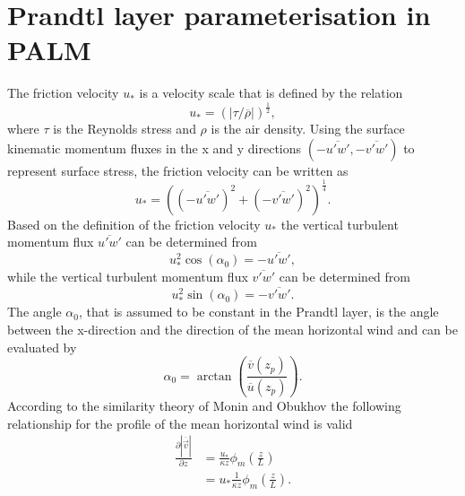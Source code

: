 \documentclass[11pt,a4paper,titlepage]{scrreprt}
\begin{document}
\pagebreak

\chapter{Prandtl layer parameterisation in PALM}

The friction velocity $u_{\ast}$ is a velocity scale that is defined by the relation 
\begin{equation}
u_{\ast}=\left ( \left | \tau / \overline{\rho} \right | \right )^{\frac{1}{2}}, 
\end{equation}
where $\tau$ is the Reynolds stress and $\rho$ is the air density.
Using the surface kinematic momentum fluxes in the x and y directions 
$\left ( -\overline{u'w'}, -\overline{v'w'} \right )$ to represent 
surface stress, the friction velocity can be written as   
\begin{equation}
u_{\ast}=\left ( (-\overline{u'w'})^2 + (-\overline{v'w'})^2 \right )^{\frac{1}{4}}.
\end{equation}
Based on the definition of the friction velocity $u_{\ast}$ the vertical turbulent 
momentum flux $\overline{u'w'}$ can be determined from 
\begin{equation}
{u^2_{\ast}} \cos \left ( \alpha_0 \right ) = - \overline{u'w'},
\end{equation}
while the vertical turbulent momentum flux $\overline{v'w'}$ can be determined 
from  
\begin{equation}
{u^2_{\ast}} \sin \left ( \alpha_0 \right ) = - \overline{v'w'}.
\end{equation}
The angle $\alpha_0$, that is assumed to be constant in the Prandtl layer, is the 
angle between the x-direction and the direction of the mean horizontal wind and can 
be evaluated by   
\begin{equation} \label{win}
\alpha_0 = \arctan \left ( \frac{\overline{v}(z_p)}{\overline{u}(z_p)} \right ).
\end{equation}
According to the similarity theory of Monin and Obukhov the following relationship for 
the profile of the mean horizontal wind is valid
\begin{equation} \label{hmpr}
\begin{split}
\frac{\partial \left | \overline{\vec{v}} \right |}{\partial z} &= \frac{u_{\ast}}{\kappa z} \phi_m \left ( \frac{z}{L} \right ) \\
                                                                &= u_{\ast} \frac{1}{\kappa z} \phi_m \left ( \frac{z}{L} \right ).
\end{split}  
\end{equation}
\end{document}
